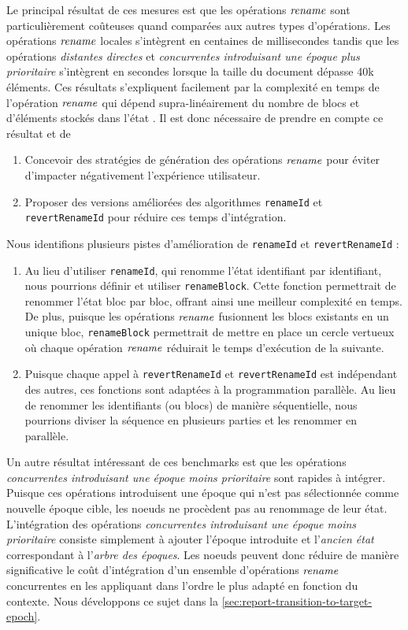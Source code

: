 Le principal résultat de ces mesures est que les opérations $\mathit{rename}$ sont particulièrement coûteuses quand comparées aux autres types d'opérations.
Les opérations $\mathit{rename}$ locales s'intègrent en centaines de millisecondes tandis que les opérations \emph{distantes directes} et \emph{concurrentes introduisant une époque plus prioritaire} s'intègrent en secondes lorsque la taille du document dépasse 40k éléments.
Ces résultats s'expliquent facilement par la complexité en temps de l'opération $\mathit{rename}$ qui dépend supra-linéairement du nombre de blocs et d'éléments stockés dans l'état .
Il est donc nécessaire de prendre en compte ce résultat et de
\begin{enumerate}
  \item Concevoir des stratégies de génération des opérations $\mathit{rename}$ pour éviter d'impacter négativement l'expérience utilisateur.
  \item Proposer des versions améliorées des algorithmes \texttt{renameId} et \texttt{revertRenameId} pour réduire ces temps d'intégration.
\end{enumerate}

Nous identifions plusieurs pistes d'amélioration de \texttt{renameId} et \texttt{revertRenameId} :
\begin{enumerate}
  \item Au lieu d'utiliser \texttt{renameId}, qui renomme l'état identifiant par identifiant, nous pourrions définir et utiliser \texttt{renameBlock}.
    Cette fonction permettrait de renommer l'état bloc par bloc, offrant ainsi une meilleur complexité en temps.
    De plus, puisque les opérations $\mathit{rename}$ fusionnent les blocs existants en un unique bloc, \texttt{renameBlock} permettrait de mettre en place un cercle vertueux où chaque opération $\mathit{rename}$ réduirait le temps d'exécution de la suivante.
  \item Puisque chaque appel à \texttt{revertRenameId} et \texttt{revertRenameId} est indépendant des autres, ces fonctions sont adaptées à la programmation parallèle.
    Au lieu de renommer les identifiants (ou blocs) de manière séquentielle, nous pourrions diviser la séquence en plusieurs parties et les renommer en parallèle.
\end{enumerate}

Un autre résultat intéressant de ces benchmarks est que les opérations \emph{concurrentes introduisant une époque moins prioritaire} sont rapides à intégrer.
Puisque ces opérations introduisent une époque qui n'est pas sélectionnée comme nouvelle époque cible, les noeuds ne procèdent pas au renommage de leur état.
L'intégration des opérations \emph{concurrentes introduisant une époque moins prioritaire} consiste simplement à ajouter l'époque introduite et l'\emph{ancien état} correspondant à l'\emph{arbre des époques}.
Les noeuds peuvent donc réduire de manière significative le coût d'intégration d'un ensemble d'opérations $\mathit{rename}$ concurrentes en les appliquant dans l'ordre le plus adapté en fonction du contexte.
Nous développons ce sujet dans la \autoref{sec:report-transition-to-target-epoch}.
